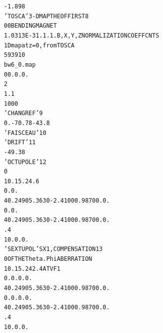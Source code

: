 \begin{tiny}
\begin{alltt}
    -1.898                                                                      
   'TOSCA'                             3-D  MAP  THE  OF  FIRST            8
    0  0                                           BENDING  MAGNET     
   1.0313E-3  1. 1. 1.                 B, X, Y, Z NORMALIZATION COEFFCNTS    
   1D map at z=0, from TOSCA                                                    
   59  39  1 0                                                                    
   bw6_0.map                                                                    
   0  0. 0. 0.                                                                  
   2                                                        
     1.1                                                                        
   1 0 0 0                                                                      
   'CHANGREF'                                                              9
   0.  -70.78  -43.8                                                            
  'FAISCEAU'                                                              10
    'DRIFT'                                                               11
      -49.38                                                                    
   'OCTUPOLE'                                                             12
   0                                                        
    10. 15.24  .6                                                               
    0. 0.                                                                       
    4    0.2490   5.3630  -2.4100   0.9870   0.   0.                            
    0. 0.                                                                       
    4    0.2490   5.3630  -2.4100   0.9870   0.   0.                            
    .4                                                                          
    1  0. 0. 0.                                                                 
   'SEXTUPOL'                          SX1, COMPENSATION                  13
   0                                   OF  THE  Theta.Phi  ABERRATION         
   10.  15.24  2.4                     AT  VF1                                
    0.  0. 0. 0.                                                                
    4    0.2490   5.3630  -2.4100   0.9870   0.   0.                            
    0. 0.  0. 0.                                                                
    4    0.2490   5.3630  -2.4100   0.9870   0.   0.                            
     .4                                                                         
    1  0. 0. 0.                                                                 

\end{alltt}
\end{tiny}
